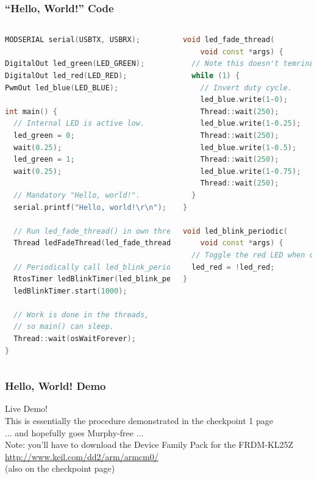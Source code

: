 \documentclass{beamer}
\begin{document}
\begin{frame}[fragile]
\frametitle{``Hello, World!'' Code}
\begin{columns}[t]
\centering
\begin{lstlisting}[language=C++,basicstyle=\ttfamily\tiny]
MODSERIAL serial(USBTX, USBRX);

DigitalOut led_green(LED_GREEN);
DigitalOut led_red(LED_RED);
PwmOut led_blue(LED_BLUE);

int main() {
  // Internal LED is active low.
  led_green = 0;  
  wait(0.25);
  led_green = 1;
  wait(0.25);
  
  // Mandatory "Hello, world!".
  serial.printf("Hello, world!\r\n");

  // Run led_fade_thread() in own thread
  Thread ledFadeThread(led_fade_thread);
  
  // Periodically call led_blink_periodic()
  RtosTimer ledBlinkTimer(led_blink_periodic);
  ledBlinkTimer.start(1000);

  // Work is done in the threads,
  // so main() can sleep.
  Thread::wait(osWaitForever);
}
\end{lstlisting}

\begin{lstlisting}[language=C++,basicstyle=\ttfamily\tiny]
void led_fade_thread(
    void const *args) {
  // Note this doesn't temrinate.
  while (1) {
    // Invert duty cycle.
    led_blue.write(1-0);
    Thread::wait(250);
    led_blue.write(1-0.25);
    Thread::wait(250);
    led_blue.write(1-0.5);
    Thread::wait(250);
    led_blue.write(1-0.75);
    Thread::wait(250);
  }
}

void led_blink_periodic(
    void const *args) {
  // Toggle the red LED when called.
  led_red = !led_red;
}
\end{lstlisting}
\end{columns}
\end{frame}

\begin{frame}
\frametitle{Hello, World! Demo}
\begin{center}
{\huge Live Demo!} \\
\vspace{20px}
\tiny{This is essentially the procedure demonstrated in the checkpoint 1 page} \\
\vspace{20px}
\tiny{... and hopefully goes Murphy-free ...} \\
\vspace{40px}
{\tiny Note: you'll have to download the Device Family Pack for the FRDM-KL25Z \\
\url{http://www.keil.com/dd2/arm/armcm0/} \\
(also on the checkpoint page)} \\
\end{center}
\end{frame}
\end{document}
